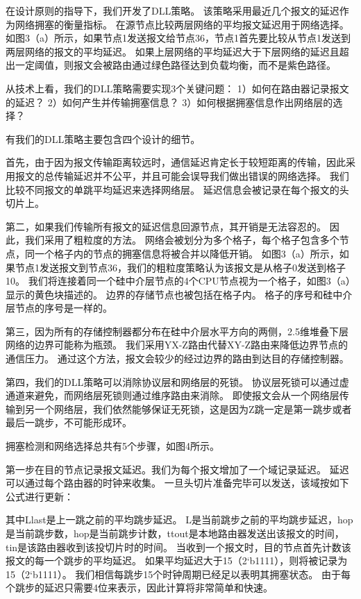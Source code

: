 在设计原则的指导下，我们开发了DLL策略。
该策略采用最近几个报文的延迟作为网络拥塞的衡量指标。
在源节点比较两层网络的平均报文延迟用于网络选择。
如图3（a）所示，如果节点1发送报文给节点36，节点1首先要比较从节点1发送到两层网络的报文的平均延迟。
如果上层网络的平均延迟大于下层网络的延迟且超出一定阈值，则报文会被路由通过绿色路径达到负载均衡，而不是紫色路径。

从技术上看，我们的DLL策略需要实现3个关键问题：
1）如何在路由器记录报文的延迟？
2）如何产生并传输拥塞信息？
3）如何根据拥塞信息作出网络层的选择？

有我们的DLL策略主要包含四个设计的细节。

首先，由于因为报文传输距离较远时，通信延迟肯定长于较短距离的传输，因此采用报文的总传输延迟并不公平，并且可能会误导我们做出错误的网络选择。
我们比较不同报文的单跳平均延迟来选择网络层。
延迟信息会被记录在每个报文的头切片上。

第二，如果我们传输所有报文的延迟信息回源节点，其开销是无法容忍的。
因此，我们采用了粗粒度的方法。
网络会被划分为多个格子，每个格子包含多个节点，同一个格子内的节点的拥塞信息将被合并以降低开销。
如图3（a）所示，如果节点1发送报文到节点36，我们的粗粒度策略认为该报文是从格子0发送到格子10。
我们将连接着同一个硅中介层节点的4个CPU节点视为一个格子，如图3（a）显示的黄色块描述的。
边界的存储节点也被包括在格子内。
格子的序号和硅中介层节点的序号是一样的。

第三，因为所有的存储控制器都分布在硅中介层水平方向的两侧，2.5维堆叠下层网络的边界可能称为瓶颈。
我们采用YX-Z路由代替XY-Z路由来降低边界节点的通信压力。
通过这个方法，报文会较少的经过边界的路由到达目的存储控制器。

第四，我们的DLL策略可以消除协议层和网络层的死锁。
协议层死锁可以通过虚通道来避免，而网络层死锁则通过维序路由来消除。
即使报文会从一个网络层传输到另一个网络层，我们依然能够保证无死锁，这是因为Z跳一定是第一跳步或者最后一跳步，不可能形成环。

拥塞检测和网络选择总共有5个步骤，如图4所示。

第一步在目的节点记录报文延迟。我们为每个报文增加了一个域记录延迟。
延迟可以通过每个路由器的时钟来收集。
一旦头切片准备完毕可以发送，该域按如下公式进行更新：

其中Llast是上一跳之前的平均跳步延迟。
L是当前跳步之前的平均跳步延迟，hop是当前跳步数，hop是当前跳步计数，ttout是本地路由器发送出该报文的时间，tin是该路由器收到该投切片时的时间。
当收到一个报文时，目的节点首先计数该报文的每一个跳步的平均延迟。
如果平均延迟大于15（2‘b1111），则将被记录为15（2‘b1111）。
我们相信每跳步15个时钟周期已经足以表明其拥塞状态。
由于每个跳步的延迟只需要4位来表示，因此计算将非常简单和快速。

